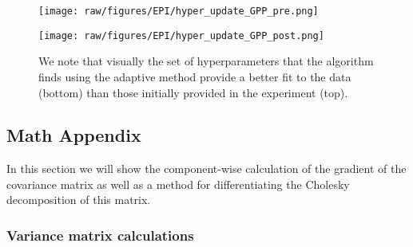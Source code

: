 \begin{figure}[hpt]
 	\centerline{\texttt{[image: raw/figures/EPI/hyper\_update\_GPP\_pre.png]}}
    \centerline{\texttt{[image: raw/figures/EPI/hyper\_update\_GPP\_post.png]}}
    \caption[Evolution of hyperparameters]{We note that visually the set of hyperparameters that the algorithm finds using the adaptive method provide a better fit to the data (bottom) than those initially provided in the experiment (top).}
 	\label{fig:EPI_hyper_2}
\end{figure}


\subsection{Math Appendix}

In this section we will show the component-wise calculation of the gradient of the covariance matrix as well as a method for differentiating the Cholesky decomposition of this matrix.

\subsubsection{Variance matrix calculations}
\label{EPI_imp_var}

